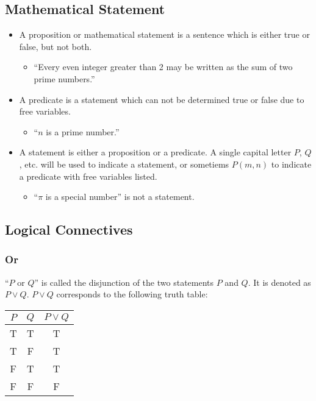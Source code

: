 \documentclass[../main.tex]{subfiles}
\begin{document}
\subsection{Mathematical Statement}
\begin{itemize}
    \item A \textsf{proposition} or \textsf{mathematical statement} is a sentence which is either true or false, but not both.
        \begin{itemize}
            \item ``Every even integer greater than 2 may be written as the sum of two prime numbers.''
        \end{itemize}
    \item A \textsf{predicate} is a statement which can not be determined true or false due to \textsf{free variables}.
        \begin{itemize}
            \item ``$n$ is a prime number.''
        \end{itemize}
    \item A \textsf{statement} is either a proposition or a predicate.
        A single capital letter $P$, $Q$, etc. will be used to indicate a statement, or sometiems $P(m ,n)$ to indicate a predicate with free variables listed.
        \begin{itemize}
            \item ``$\pi$ is a special number'' is not a statement.
        \end{itemize}
\end{itemize}

\subsection{Logical Connectives}
\subsubsection{Or}
``$P$ or $Q$'' is called the \textsf{disjunction} of the two statements $P$ and $Q$.
It is denoted as $P \vee Q$.
$P \vee Q$ corresponds to the following truth table:
\begin{table}[H]
    \centering
    \begin{tabular}{c|c|c}
        $P$ & $Q$ & $P \vee Q$ \\ \hline
        T   & T   & T          \\
        T   & F   & T          \\
        F   & T   & T          \\
        F   & F   & F
    \end{tabular}
\end{table}
\end{document}
